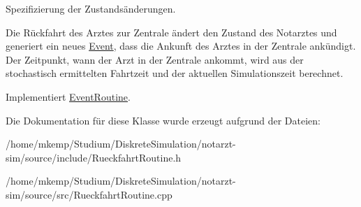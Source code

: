 Spezifizierung der Zustandsänderungen. 

Die Rückfahrt des Arztes zur Zentrale ändert den Zustand des Notarztes und generiert ein neues \hyperlink{classEvent}{Event}, dass die Ankunft des Arztes in der Zentrale ankündigt. Der Zeitpunkt, wann der Arzt in der Zentrale ankommt, wird aus der stochastisch ermittelten Fahrtzeit und der aktuellen Simulationszeit berechnet. 

Implementiert \hyperlink{classEventRoutine_aede9b0fdb576a4a262ced2d7d6548c14}{Event\+Routine}.



Die Dokumentation für diese Klasse wurde erzeugt aufgrund der Dateien\+:\begin{DoxyCompactItemize}
\item 
/home/mkemp/\+Studium/\+Diskrete\+Simulation/notarzt-\/sim/source/include/Rueckfahrt\+Routine.\+h\item 
/home/mkemp/\+Studium/\+Diskrete\+Simulation/notarzt-\/sim/source/src/Rueckfahrt\+Routine.\+cpp\end{DoxyCompactItemize}
